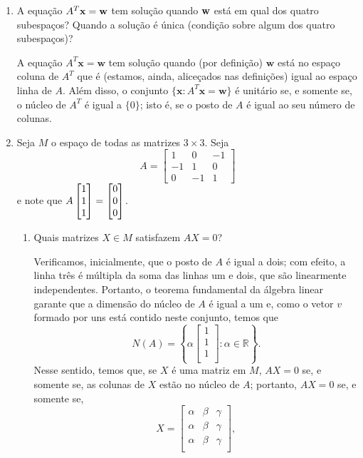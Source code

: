 \documentclass[leqno]{article}
\begin{document}
\begin{enumerate}
\item A equação $A^T \mathbf{x} = \mathbf{w}$ tem solução quando $\mathbf{w}$ está em qual dos quatro subespaços? Quando a solução é única (condição sobre algum dos quatro subespaços)?

\begin{sol} 
	A equação $A^{T} \mathbf{x} = \mathbf{w}$ tem solução quando (por definição) $\mathbf{w}$ está no espaço coluna de $A^{T}$ que é (estamos, ainda, aliceçados nas definições) igual ao espaço linha de $A$. Além disso, o conjunto $\{\mathbf{x} : A^{T}\mathbf{x} = \mathbf{w}\}$ é unitário se, e somente se, o núcleo de $A^{T}$ é igual a $\{0\}$; isto é, se o posto de $A$ é igual ao seu número de colunas.   
\end{sol} 

\item Seja $M$ o espaço de todas as matrizes $3 \times 3$. Seja
$$A = \begin{bmatrix}
1 & 0 & -1 \\
-1 & 1 & 0 \\
0 & -1 & 1
\end{bmatrix}$$
e note que $A \begin{bmatrix} 1 \\ 1 \\ 1 \end{bmatrix} = \begin{bmatrix} 0 \\ 0 \\ 0 \end{bmatrix}$.

\begin{enumerate}

\item Quais matrizes $X \in M$ satisfazem $AX = 0$?

	\begin{sol} 
		Verificamos, inicialmente, que o posto de $A$ é igual a dois; com efeito, a linha três é múltipla da soma das linhas um e dois, que são linearmente independentes. Portanto, o teorema fundamental da álgebra linear garante que a dimensão do núcleo de $A$ é igual a um e, como o vetor $v$ formado por uns está contido neste conjunto, temos que 
		\begin{equation*} 
			N(A) = 
			\left\{ \alpha 
				\begin{bmatrix} 
					1 \\ 
					1 \\ 
					1 \\ 
				\end{bmatrix} : 
				\alpha \in \mathbb{R} 
			\right\}. 
		\end{equation*} 
		\noindent Nesse sentido, temos que, se $X$ é uma matriz em $M$, $AX = 0$ se, e somente se, as colunas de $X$ estão no núcleo de $A$; portanto, $AX = 0$ se, e somente se, 
		\begin{equation*} 
			X = 
			\begin{bmatrix} 
				\alpha & \beta & \gamma \\ 
				\alpha & \beta & \gamma \\ 
				\alpha & \beta & \gamma \\ 
			\end{bmatrix}, 
		\end{equation*} 


\end{sol}
\end{enumerate}
\end{enumerate}
\end{document}
